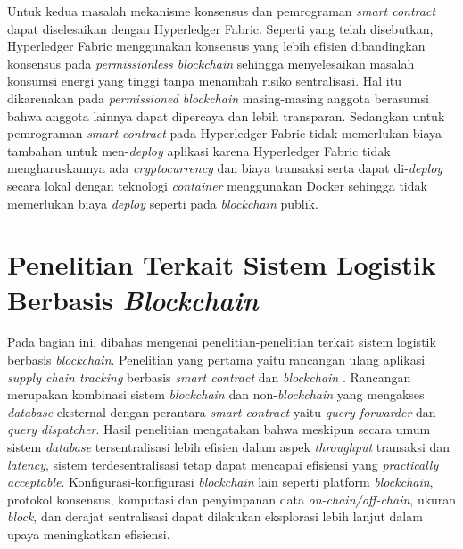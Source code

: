 Untuk kedua masalah mekanisme konsensus dan pemrograman \textit{smart contract} dapat diselesaikan dengan Hyperledger Fabric. Seperti yang telah disebutkan, Hyperledger Fabric menggunakan konsensus yang lebih efisien dibandingkan konsensus pada \textit{permissionless blockchain} sehingga menyelesaikan masalah konsumsi energi yang tinggi tanpa menambah risiko sentralisasi. Hal itu dikarenakan pada \textit{permissioned blockchain} masing-masing anggota berasumsi bahwa anggota lainnya dapat dipercaya dan lebih transparan. Sedangkan untuk pemrograman \textit{smart contract} pada Hyperledger Fabric tidak memerlukan biaya tambahan untuk men-\textit{deploy} aplikasi karena Hyperledger Fabric tidak mengharuskannya ada \textit{cryptocurrency} dan biaya transaksi serta dapat di-\textit{deploy} secara lokal dengan teknologi \textit{container} menggunakan Docker sehingga tidak memerlukan biaya \textit{deploy} seperti pada \textit{blockchain} publik. 

\section{Penelitian Terkait Sistem Logistik Berbasis \textit{Blockchain}}
\label{sec:penelitianlain}

Pada bagian ini, dibahas mengenai penelitian-penelitian terkait sistem logistik berbasis \textit{blockchain}. Penelitian yang pertama yaitu rancangan ulang aplikasi \textit{supply chain tracking} berbasis \textit{smart contract} dan \textit{blockchain} \citep{Chang2019}. Rancangan merupakan kombinasi sistem \textit{blockchain} dan non-\textit{blockchain} yang mengakses \textit{database} eksternal dengan perantara \textit{smart contract} yaitu \textit{query forwarder} dan \textit{query dispatcher}. Hasil penelitian mengatakan bahwa meskipun secara umum sistem \textit{database} tersentralisasi lebih efisien dalam aspek \textit{throughput} transaksi dan \textit{latency}, sistem terdesentralisasi tetap dapat mencapai efisiensi yang \textit{practically acceptable}. Konfigurasi-konfigurasi \textit{blockchain} lain seperti platform \textit{blockchain}, protokol konsensus, komputasi dan penyimpanan data \textit{on-chain/off-chain}, ukuran \textit{block}, dan derajat sentralisasi dapat dilakukan eksplorasi lebih lanjut dalam upaya meningkatkan efisiensi.

